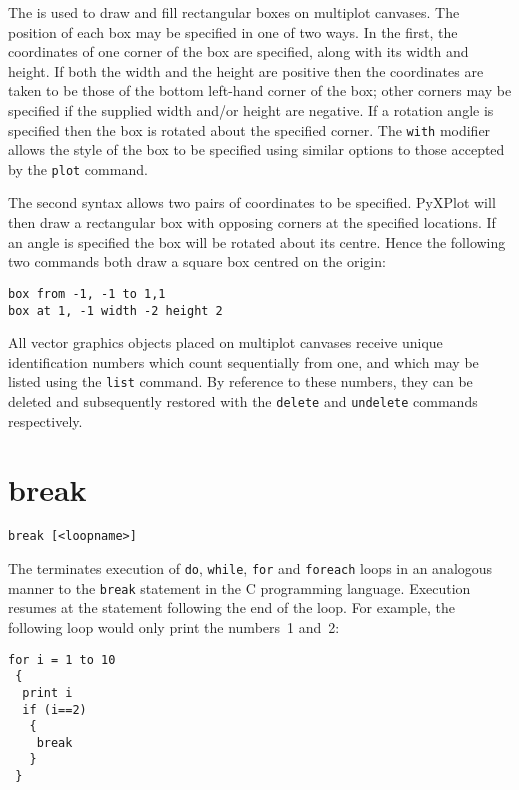 The  is used to draw and fill rectangular boxes on multiplot
canvases.  The position of each box may be specified in one of two ways.  In the
first, the coordinates of one corner of the box are specified, along with its
width and height. If both the width and the height are positive then the
coordinates are taken to be those of the bottom left-hand corner of the box;
other corners may be specified if the supplied width and/or height are
negative. If a rotation angle is specified then the box is rotated about the
specified corner.  The {\tt with} modifier allows the style of the box to be
specified using similar options to those accepted by the {\tt plot} command.

The second syntax allows two pairs of coordinates to be specified.  PyXPlot
will then draw a rectangular box with opposing corners at the specified
locations.  If an angle is specified the box will be rotated about its centre.
Hence the following two commands both draw a square box centred on the origin:

\begin{verbatim}
box from -1, -1 to 1,1
box at 1, -1 width -2 height 2
\end{verbatim}

All vector graphics objects placed on multiplot canvases receive unique
identification numbers which count sequentially from one, and which may be
listed using the {\tt list} command.  By reference to these numbers, they can
be deleted and subsequently restored with the {\tt delete} and {\tt undelete}
commands respectively.


\section{break}

\begin{verbatim}
break [<loopname>]
\end{verbatim}

The  terminates execution of {\tt do}, {\tt while}, {\tt for}
and {\tt foreach} loops in an analogous manner to the {\tt break} statement in
the C programming language.  Execution resumes at the statement following the
end of the loop. For example, the following loop would only print the numbers~1
and~2:

\begin{verbatim}
for i = 1 to 10
 {
  print i
  if (i==2)
   {
    break
   }
 }
\end{verbatim}

